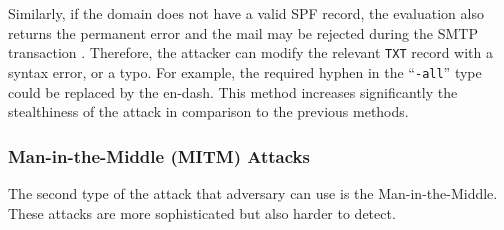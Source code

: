 Similarly, if the domain does not have a valid SPF record, %
the evaluation also returns the permanent error and the mail may be rejected during the SMTP transaction \cite{spf}.
%
%
Therefore, the attacker can modify %
the relevant \texttt{TXT} record with a syntax error, or a typo. 
For example, the required hyphen in the ``\texttt{-all}'' type could be replaced by the en-dash. %
This method increases significantly the stealthiness of the attack in comparison to the previous methods. 


\begin{comment}
\textbf{Deletion or modification of a \texttt{PTR} record:} 
A \texttt{PTR} record, or a reverse DNS of an IP, translates the IP address to its hostname.
The \texttt{PTR} record is used by different services, notably by e-mail anti-spam techniques to protect recipients from phishing attacks.
Most of receiving mail server checks if the IP address of the sending mail server has a \texttt{PTR} record and if it matches the IP obtained via the forward DNS resolution of the hostname defined in the \texttt{PTR} record.
Emails without the \texttt{PTR} record may get rejected or marked as spam, therefore, the adversary could modify or completely delete the \texttt{PTR} record to prevent recipients from receiving legitimate emails.

The tricky part is that the PTR record is not configured by the DNS service provider but by the ISP, so zone poisoning fails.
\end{comment}



\subsubsection{Man-in-the-Middle (MITM) Attacks}
The second type of the attack that adversary can use is the Man-in-the-Middle. 
These attacks are more sophisticated but also harder to detect. 


